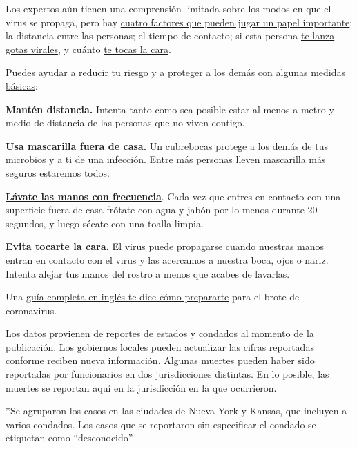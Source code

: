 Los expertos aún tienen una comprensión limitada sobre los modos en que
el virus se propaga, pero hay
\href{https://www.nytimes.com/es/2020/03/03/espanol/ciencia-y-tecnologia/coronavirus-como-se-transmite.html}{cuatro
factores que pueden jugar un papel importante}: la distancia entre las
personas; el tiempo de contacto; si esta persona
\href{https://www.nytimes.com/es/2020/07/08/espanol/ciencia-y-tecnologia/coronavirus-aire-aerosoles.html}{te
lanza gotas virales}, y cuánto
\href{https://www.nytimes.com/es/2020/03/06/espanol/estilos-de-vida/no-te-toques-la-cara.html}{te
tocas la cara}.

Puedes ayudar a reducir tu riesgo y a proteger a los demás con
\href{https://www.nytimes.com/es/article/el-coronavirus-proteger-preparar.html}{algunas
medidas básicas}:

\textbf{Mantén distancia.} Intenta tanto como sea posible estar al menos
a metro y medio de distancia de las personas que no viven contigo.

\textbf{Usa mascarilla fuera de casa.} Un cubrebocas protege a los demás
de tus microbios y a ti de una infección. Entre más personas lleven
mascarilla más seguros estaremos todos.

\textbf{\href{https://www.nytimes.com/es/2020/03/19/espanol/ciencia-y-tecnologia/como-lavarse-las-manos-coronavirus.html}{Lávate
las manos con frecuencia}}. Cada vez que entres en contacto con una
superficie fuera de casa frótate con agua y jabón por lo menos durante
20 segundos, y luego sécate con una toalla limpia.

\textbf{Evita tocarte la cara.} El virus puede propagarse cuando
nuestras manos entran en contacto con el virus y las acercamos a nuestra
boca, ojos o nariz. Intenta alejar tus manos del rostro a menos que
acabes de lavarlas.

Una
\href{https://www.nytimes.com/interactive/2020/world/coronavirus-tips-advice.html}{guía
completa en inglés te dice cómo prepararte} para el brote de
coronavirus.

Los datos provienen de reportes de estados y condados al momento de la
publicación. Los gobiernos locales pueden actualizar las cifras
reportadas conforme reciben nueva información. Algunas muertes pueden
haber sido reportadas por funcionarios en dos jurisdicciones distintas.
En lo posible, las muertes se reportan aquí en la jurisdicción en la que
ocurrieron.

*Se agruparon los casos en las ciudades de Nueva York y Kansas, que
incluyen a varios condados. Los casos que se reportaron sin especificar
el condado se etiquetan como ``desconocido''.

